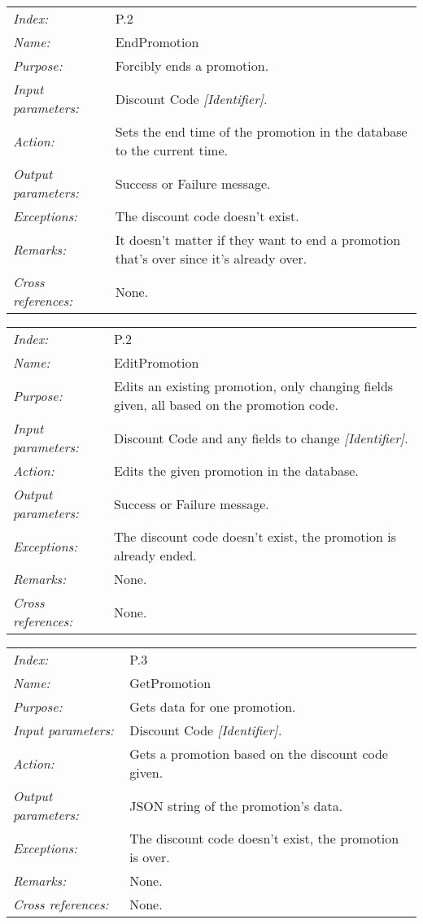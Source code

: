 \documentclass[10pt,letter]{article}
\begin{document}
\begin{tabularx}{\textwidth}{l X}
    \it{Index:} & P.2 \\
    \it{Name:} & EndPromotion \\
    \it{Purpose:} & Forcibly ends a promotion. \\
    \it{Input parameters:} & Discount Code \it{[Identifier]}.\\
    \it{Action:} & Sets the end time of the promotion in the database to the current time. \\
    \it{Output parameters:} & Success or Failure message. \\
    \it{Exceptions:} & The discount code doesn't exist. \\
    \it{Remarks:} & It doesn't matter if they want to end a promotion that's over since it's already over.\\
    \it{Cross references:} & None. \\
    \hline
\end{tabularx}

\begin{tabularx}{\textwidth}{l X}
    \it{Index:} & P.2 \\
    \it{Name:} & EditPromotion \\
    \it{Purpose:} & Edits an existing promotion, only changing fields given, all based on the promotion code. \\
    \it{Input parameters:} & Discount Code and any fields to change \it{[Identifier]}.\\
    \it{Action:} & Edits the given promotion in the database. \\
    \it{Output parameters:} & Success or Failure message. \\
    \it{Exceptions:} & The discount code doesn't exist, the promotion is already ended. \\
    \it{Remarks:} & None. \\
    \it{Cross references:} & None. \\
    \hline
\end{tabularx}

\begin{tabularx}{\textwidth}{l X}
    \it{Index:} & P.3 \\
    \it{Name:} & GetPromotion \\
    \it{Purpose:} & Gets data for one promotion. \\
    \it{Input parameters:} & Discount Code \it{[Identifier]}.\\
    \it{Action:} & Gets a promotion based on the discount code given.\\
    \it{Output parameters:} & JSON string of the promotion's data. \\
    \it{Exceptions:} & The discount code doesn't exist, the promotion is over. \\
    \it{Remarks:} & None. \\
    \it{Cross references:} & None. \\
    \hline
\end{tabularx}
\end{document}
